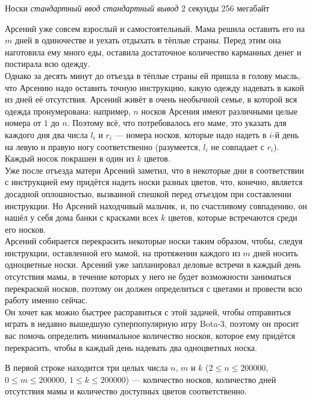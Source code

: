 \begin{problem}%
{Носки}%
{\textsl{стандартный ввод}}%
{\textsl{стандартный вывод}}%
{2 секунды}%
{256 мегабайт}%
{}

Арсений уже совсем взрослый и самостоятельный. Мама решила оставить его на $m$ дней в одиночестве и уехать отдыхать в тёплые страны. Перед этим она наготовила ему много еды, оставила достаточное количество карманных денег и постирала всю одежду.\\

Однако за десять минут до отъезда в тёплые страны ей пришла в голову мысль, что Арсению надо оставить точную инструкцию, какую одежду надевать в какой из дней её отсутствия. Арсений живёт в очень необычной семье, в которой вся одежда пронумерована: например, $n$ носков Арсения имеют различными целые номера от $1$ до $n$. Поэтому всё, что потребовалось его маме, это указать для каждого дня два числа $l_i$ и $r_i$ — номера носков, которые надо надеть в $i$-й день на левую и правую ногу соответственно (разумеется, $l_i$ не совпадает с $r_i$). Каждый носок покрашен в один из $k$ цветов.\\

Уже после отъезда матери Арсений заметил, что в некоторые дни в соответствии с инструкцией ему придётся надеть носки разных цветов, что, конечно, является досадной оплошностью, вызванной спешкой перед отъездом при составлении инструкции. Но Арсений находчивый мальчик, и, по счастливому совпадению, он нашёл у себя дома банки с красками всех $k$ цветов, которые встречаются среди его носков.\\

Арсений собирается перекрасить некоторые носки таким образом, чтобы, следуя инструкции, оставленной его мамой, на протяжении каждого из $m$ дней носить одноцветные носки. Арсений уже запланировал деловые встречи в каждый день отсутствия мамы, в течение которых у него не будет возможности заниматься перекраской носков, поэтому он должен определиться с цветами и провести всю работу именно сейчас.\\

Он хочет как можно быстрее расправиться с этой задачей, чтобы отправиться играть в недавно вышедшую суперпопулярную игру Bota-3, поэтому он просит вас помочь определить минимальное количество носков, которое ему придётся перекрасить, чтобы в каждый день надевать два одноцветных носка.

\InputFile

В первой строке находится три целых числа $n$, $m$ и $k$ ($2 \le n \le 200000$, $0 \le m \le 200000$, $1 \le k \le 200000$) — количество носков, количество дней отсутствия мамы и количество доступных цветов соответственно.\\


\end{problem}
